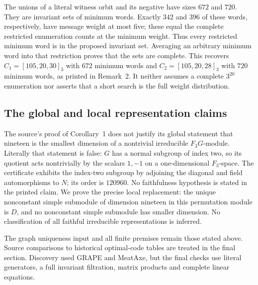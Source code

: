 The unions of a literal witness orbit and its negative have sizes $672$
and $720$. They are invariant sets of minimum words. Exactly $342$ and
$396$ of these words, respectively, have message weight at most five;
these equal the complete restricted enumeration counts at the minimum
weight. Thus every restricted minimum word is in the proposed invariant
set. Averaging an arbitrary minimum word into that restriction proves
that the sets are complete. This recovers
$C_1=[105,20,30]_3$ with $672$ minimum words and
$C_2=[105,20,28]_3$ with $720$ minimum words, as printed in Remark~2.
It neither assumes a complete $3^{20}$ enumeration nor asserts that a
short search is the full weight distribution.

\subsection{The global and local representation claims}
The source's proof of Corollary~1 does not justify its global statement
that nineteen is the smallest dimension of a nontrivial irreducible
$F_3G$-module. Literally that statement is false: $G$ has a normal
subgroup of index two, so its quotient acts nontrivially by the scalars
$1,-1$ on a one-dimensional $F_3$-space. The certificate exhibits the
index-two subgroup by adjoining the diagonal and field automorphisms
to $N$; its order is $120960$. No faithfulness hypothesis is stated in
the printed claim. We prove the precise local replacement: the unique
nonconstant simple submodule of dimension nineteen in this permutation
module is $D$, and no nonconstant simple submodule has smaller dimension.
No classification of all faithful irreducible representations is inferred.

The graph uniqueness input and all finite premises remain those stated above. Source comparisons to historical optimal-code tables are treated in the final section. Discovery used GRAPE and MeatAxe, but the final checks use literal generators, a full invariant filtration, matrix products and complete linear equations.

